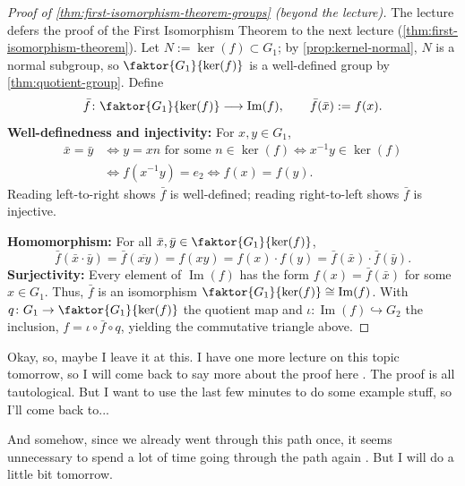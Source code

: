 \begin{content}
\begin{proof}[Proof of \cref{thm:first-isomorphism-theorem-groups} (beyond the lecture)]
The lecture defers the proof of the First Isomorphism Theorem to the next lecture (\cref{thm:first-isomorphism-theorem}). Let $N := \ker(f) \subset G_1$; by \cref{prop:kernel-normal}, $N$ is a normal subgroup, so $\faktor{G_1}{\ker(f)}$ is a well-defined group by \cref{thm:quotient-group}. Define
\[
\bar{f} \colon \faktor{G_1}{\ker(f)} \longrightarrow \operatorname{Im}(f), \qquad \bar{f}(\bar{x}) := f(x).
\]
\textbf{Well-definedness and injectivity:} For $x, y \in G_1$,
\begin{align*}
\bar{x} = \bar{y}
&\iff y = x n \text{ for some } n \in \ker(f)
\iff x^{-1} y \in \ker(f) \\
&\iff f(x^{-1} y) = e_2
\iff f(x) = f(y).
\end{align*}
Reading left-to-right shows $\bar{f}$ is well-defined; reading right-to-left shows $\bar{f}$ is injective.

\textbf{Homomorphism:} For all $\bar{x}, \bar{y} \in \faktor{G_1}{\ker(f)}$,
\[
\bar{f}(\bar{x} \cdot \bar{y}) = \bar{f}(\overline{xy}) = f(xy) = f(x) \cdot f(y) = \bar{f}(\bar{x}) \cdot \bar{f}(\bar{y}).
\]
\textbf{Surjectivity:} Every element of $\operatorname{Im}(f)$ has the form $f(x) = \bar{f}(\bar{x})$ for some $x \in G_1$. Thus, $\bar{f}$ is an isomorphism $\faktor{G_1}{\ker(f)} \cong \operatorname{Im}(f)$. With $q \colon G_1 \to \faktor{G_1}{\ker(f)}$ the quotient map and $\iota \colon \operatorname{Im}(f) \hookrightarrow G_2$ the inclusion, $f = \iota \circ \bar{f} \circ q$, yielding the commutative triangle above.
\end{proof}
\end{content}

\begin{speech}[01:12:30 - 01:13:12]
 Okay, so, maybe I leave it at this. I have one more lecture on this topic tomorrow, so I will come back to say more about the proof here . The proof is all tautological. But I want to use the last few minutes to do some example stuff, so I'll come back to...

And somehow, since we already went through this path once, it seems unnecessary to spend a lot of time going through the path again . But I will do a little bit tomorrow.
\end{speech}

